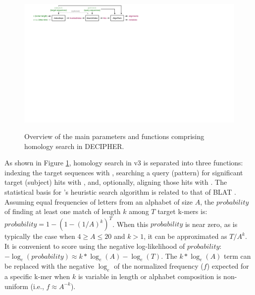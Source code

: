 \begin{figure}
\includegraphics[width=1\linewidth,alt={}]{figures/Fig1} \caption{Overview of the main parameters and functions comprising homology search in DECIPHER.}\label{fig:fig1}
\end{figure}

As shown in Figure \ref{fig:fig1}, homology search in  v3 is separated into three functions: indexing the target sequences with , searching a query (pattern) for significant target (subject) hits with , and, optionally, aligning those hits with . The statistical basis for 's heuristic search algorithm is related to that of BLAT \citep{RN939}. Assuming equal frequencies of letters from an alphabet of size \(A\), the \(probability\) of finding at least one match of length \(k\) among \(T\) target k-mers is: \(probability = 1-(1-(1/A)^k)^T\). When this \(probability\) is near zero, as is typically the case when \(4 \ge A \le 20\) and \(k > 1\), it can be approximated as \(T/A^k\). It is convenient to score using the negative log-likelihood of \(probability\): \(-\log_e(probability) \approx k*\log_e(A) - \log_e(T)\). The \(k*\log_e(A)\) term can be replaced with the negative \(\log_e\) of the normalized frequency (\(f\)) expected for a specific k-mer when \(k\) is variable in length or alphabet composition is non-uniform (i.e., \(f \approx A^{-k}\)).

